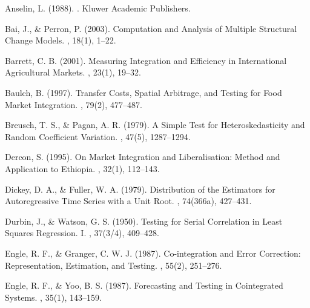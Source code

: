 \begin{thebibliography}{99}
\small  %

Anselin, L. (1988).
.
\newblock Kluwer Academic Publishers.

Bai, J., \& Perron, P. (2003).
\newblock Computation and Analysis of Multiple Structural Change Models.
, 18(1), 1--22.

Barrett, C. B. (2001).
\newblock Measuring Integration and Efficiency in International Agricultural Markets.
, 23(1), 19--32.

Baulch, B. (1997).
\newblock Transfer Costs, Spatial Arbitrage, and Testing for Food Market Integration.
, 79(2), 477--487.

Breusch, T. S., \& Pagan, A. R. (1979).
\newblock A Simple Test for Heteroskedasticity and Random Coefficient Variation.
, 47(5), 1287--1294.

Dercon, S. (1995).
\newblock On Market Integration and Liberalisation: Method and Application to Ethiopia.
, 32(1), 112--143.

Dickey, D. A., \& Fuller, W. A. (1979).
\newblock Distribution of the Estimators for Autoregressive Time Series with a Unit Root.
, 74(366a), 427--431.

Durbin, J., \& Watson, G. S. (1950).
\newblock Testing for Serial Correlation in Least Squares Regression. I.
, 37(3/4), 409--428.

Engle, R. F., \& Granger, C. W. J. (1987).
\newblock Co-integration and Error Correction: Representation, Estimation, and Testing.
, 55(2), 251--276.

Engle, R. F., \& Yoo, B. S. (1987).
\newblock Forecasting and Testing in Cointegrated Systems.
, 35(1), 143--159.


\end{thebibliography}
